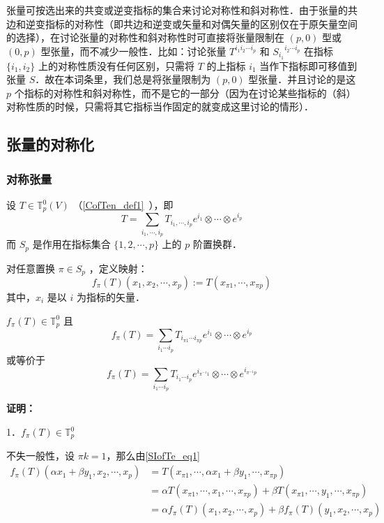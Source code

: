 张量可按选出来的共变或逆变指标的集合来讨论对称性和斜对称性．由于张量的共边和逆变指标的对称性（即共边和逆变或矢量和对偶矢量的区别仅在于原矢量空间的选择），在讨论张量的对称性和斜对称性时可直接将张量限制在 $(p,0)$ 型或 $(0,p)$ 型张量，而不减少一般性．比如：讨论张量 $T^{i_1 i_2\cdots i_p}$ 和 ${S_{i_1}}^{i_2\cdots i_p}$ 在指标 $\{i_1,i_2\}$ 上的对称性质没有任何区别，只需将 $T$ 的上指标 $i_1$ 当作下指标即可移值到张量 $S$．故在本词条里，我们总是将张量限制为 $(p,0)$ 型张量．并且讨论的是这 $p$ 个指标的对称性和斜对称性，而不是它的一部分（因为在讨论某些指标的（斜）对称性质的时候，只需将其它指标当作固定的就变成这里讨论的情形）．
\subsection{张量的对称化}
\subsubsection{对称张量}
设 $T\in \mathbb{T}_p^0(V)$ （\autoref{CofTen_def1}~），即
\begin{equation}
T=\sum_{i_1,\cdots,i_p}T_{i_1,\cdots,i_p}e^{i_1}\otimes\cdots\otimes e^{i_p}
\end{equation}
而 $S_p$ 是作用在指标集合 $\{1,2,\cdots,p\}$ 上的 $p$ 阶置换群．

对任意置换 $\pi\in S_p$ ，定义映射：
\begin{equation}\label{SIofTe_eq1}
f_\pi(T)(x_1,x_2,\cdots,x_p):=T(x_{\pi1},\cdots,x_{\pi p})
\end{equation}
其中，$x_i$ 是以 $i$ 为指标的矢量．

\begin{theorem}{}
$f_{\pi}(T)\in\mathbb{T}_p^0$ 且
\begin{equation}\label{SIofTe_eq2}
f_{\pi}(T)=\sum_{i_1\cdots i_p}T_{i_{\pi1}\cdots i_{\pi p}}e^{i_1}\otimes\cdots\otimes e^{i_p}
\end{equation}
或等价于
\begin{equation}\label{SIofTe_eq3}
f_{\pi}(T)=\sum_{i_1\cdots i_p}T_{i_1\cdots i_p}e^{i_{\pi^{-1}1}}\otimes\cdots\otimes e^{i_{\pi^{-1}p}}
\end{equation}
\end{theorem}
\textbf{证明：}

1．$f_\pi(T)\in\mathbb{T}_p^0$

不失一般性，设 $\pi k=1$，那么由\autoref{SIofTe_eq1} 
\begin{equation}
\begin{aligned}
f_\pi(T)(\alpha x_1+\beta y_1,x_2,\cdots,x_p)&=T(x_{\pi1},\cdots,\alpha x_1+\beta y_1,\cdots,x_{\pi p})\\
&=\alpha T(x_{\pi1},\cdots,x_1,\cdots,x_{\pi p})+\beta T(x_{\pi1},\cdots,y_1,\cdots,x_{\pi p})\\
&=\alpha f_{\pi}(T)(x_1,x_2,\cdots,x_p)+\beta f_{\pi}(T)(y_1,x_2,\cdots,x_p)
\end{aligned}
\end{equation}

